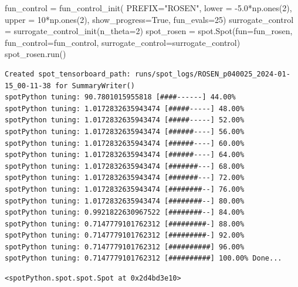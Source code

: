 \documentclass[
  letterpaper,
  DIV=11,
  numbers=noendperiod]{scrreprt}
\newenvironment{Shaded}{\begin{snugshade}}{\end{snugshade}}
\newcommand{\DecValTok}[1]{\textcolor[rgb]{0.68,0.00,0.00}{#1}}
\newcommand{\FloatTok}[1]{\textcolor[rgb]{0.68,0.00,0.00}{#1}}
\newcommand{\NormalTok}[1]{\textcolor[rgb]{0.00,0.23,0.31}{#1}}
\newcommand{\OperatorTok}[1]{\textcolor[rgb]{0.37,0.37,0.37}{#1}}
\newcommand{\StringTok}[1]{\textcolor[rgb]{0.13,0.47,0.30}{#1}}
\newcommand{\VariableTok}[1]{\textcolor[rgb]{0.07,0.07,0.07}{#1}}
\begin{document}
\begin{Shaded}
\begin{Highlighting}[]
\NormalTok{fun\_control }\OperatorTok{=}\NormalTok{ fun\_control\_init(}
\NormalTok{              PREFIX}\OperatorTok{=}\StringTok{"ROSEN"}\NormalTok{,}
\NormalTok{              lower }\OperatorTok{=} \OperatorTok{{-}}\FloatTok{5.0}\OperatorTok{*}\NormalTok{np.ones(}\DecValTok{2}\NormalTok{),}
\NormalTok{              upper }\OperatorTok{=} \DecValTok{10}\OperatorTok{*}\NormalTok{np.ones(}\DecValTok{2}\NormalTok{),}
\NormalTok{              show\_progress}\OperatorTok{=}\VariableTok{True}\NormalTok{,}
\NormalTok{              fun\_evals}\OperatorTok{=}\DecValTok{25}\NormalTok{)}
\NormalTok{surrogate\_control }\OperatorTok{=}\NormalTok{ surrogate\_control\_init(n\_theta}\OperatorTok{=}\DecValTok{2}\NormalTok{)}
\NormalTok{spot\_rosen }\OperatorTok{=}\NormalTok{ spot.Spot(fun}\OperatorTok{=}\NormalTok{fun\_rosen,}
\NormalTok{                  fun\_control}\OperatorTok{=}\NormalTok{fun\_control,}
\NormalTok{                  surrogate\_control}\OperatorTok{=}\NormalTok{surrogate\_control)}
\NormalTok{spot\_rosen.run()}
\end{Highlighting}
\end{Shaded}

\begin{verbatim}
Created spot_tensorboard_path: runs/spot_logs/ROSEN_p040025_2024-01-15_00-11-38 for SummaryWriter()
spotPython tuning: 90.7801015955818 [####------] 44.00% 
spotPython tuning: 1.0172832635943474 [#####-----] 48.00% 
spotPython tuning: 1.0172832635943474 [#####-----] 52.00% 
spotPython tuning: 1.0172832635943474 [######----] 56.00% 
spotPython tuning: 1.0172832635943474 [######----] 60.00% 
spotPython tuning: 1.0172832635943474 [######----] 64.00% 
spotPython tuning: 1.0172832635943474 [#######---] 68.00% 
spotPython tuning: 1.0172832635943474 [#######---] 72.00% 
spotPython tuning: 1.0172832635943474 [########--] 76.00% 
spotPython tuning: 1.0172832635943474 [########--] 80.00% 
spotPython tuning: 0.9921822630967522 [########--] 84.00% 
spotPython tuning: 0.7147779101762312 [#########-] 88.00% 
spotPython tuning: 0.7147779101762312 [#########-] 92.00% 
spotPython tuning: 0.7147779101762312 [##########] 96.00% 
spotPython tuning: 0.7147779101762312 [##########] 100.00% Done...
\end{verbatim}

\begin{verbatim}
<spotPython.spot.spot.Spot at 0x2d4bd3e10>
\end{verbatim}
\end{document}
